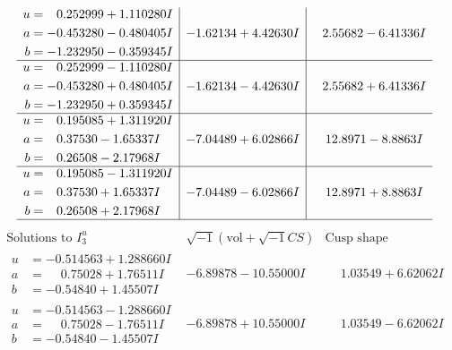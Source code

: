 \documentclass[1p]{elsarticle_modified}
\theoremstyle{definition}
\newcommand{\I}{\sqrt{-1}}
\begin{document}
$$\begin{array}{c|c|c}
\begin{aligned}
u &= \phantom{-}0.252999 + 1.110280 I \\
a &= -0.453280 - 0.480405 I \\
b &= -1.232950 - 0.359345 I\end{aligned}
 & -1.62134 + 4.42630 I & \phantom{-}2.55682 - 6.41336 I \\ \hline\begin{aligned}
u &= \phantom{-}0.252999 - 1.110280 I \\
a &= -0.453280 + 0.480405 I \\
b &= -1.232950 + 0.359345 I\end{aligned}
 & -1.62134 - 4.42630 I & \phantom{-}2.55682 + 6.41336 I \\ \hline\begin{aligned}
u &= \phantom{-}0.195085 + 1.311920 I \\
a &= \phantom{-}0.37530 - 1.65337 I \\
b &= \phantom{-}0.26508 - 2.17968 I\end{aligned}
 & -7.04489 + 6.02866 I & \phantom{-}12.8971 - 8.8863 I \\ \hline\begin{aligned}
u &= \phantom{-}0.195085 - 1.311920 I \\
a &= \phantom{-}0.37530 + 1.65337 I \\
b &= \phantom{-}0.26508 + 2.17968 I\end{aligned}
 & -7.04489 - 6.02866 I & \phantom{-}12.8971 + 8.8863 I\\
 \hline 
 \end{array}$$\newpage$$\begin{array}{c|c|c}  
\text{Solutions to }I^u_{3}& \I (\text{vol} + \sqrt{-1}CS) & \text{Cusp shape}\\
 \hline 
\begin{aligned}
u &= -0.514563 + 1.288660 I \\
a &= \phantom{-}0.75028 + 1.76511 I \\
b &= -0.54840 + 1.45507 I\end{aligned}
 & -6.89878 - 10.55000 I & \phantom{-}1.03549 + 6.62062 I \\ \hline\begin{aligned}
u &= -0.514563 - 1.288660 I \\
a &= \phantom{-}0.75028 - 1.76511 I \\
b &= -0.54840 - 1.45507 I\end{aligned}
 & -6.89878 + 10.55000 I & \phantom{-}1.03549 - 6.62062 I \\ \hline\begin{aligned}

\end{aligned}
\end{array}$$
\end{document}

